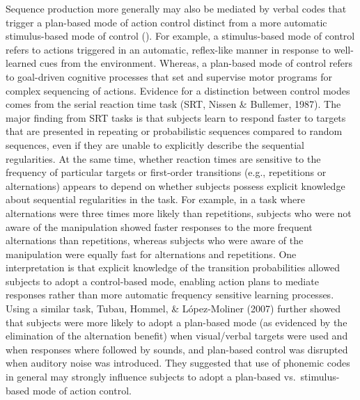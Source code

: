\documentclass[,man,floatsintext]{apa6}
\begin{document}
Sequence production more generally may also be mediated by verbal codes that trigger a plan-based mode of action control distinct from a more automatic stimulus-based mode of control (). For example, a stimulus-based mode of control refers to actions triggered in an automatic, reflex-like manner in response to well-learned cues from the environment. Whereas, a plan-based mode of control refers to goal-driven cognitive processes that set and supervise motor programs for complex sequencing of actions. Evidence for a distinction between control modes comes from the serial reaction time task (SRT, Nissen \& Bullemer, 1987). The major finding from SRT tasks is that subjects learn to respond faster to targets that are presented in repeating or probabilistic sequences compared to random sequences, even if they are unable to explicitly describe the sequential regularities. At the same time, whether reaction times are sensitive to the frequency of particular targets or first-order transitions (e.g., repetitions or alternations) appears to depend on whether subjects possess explicit knowledge about sequential regularities in the task. For example, in a task where alternations were three times more likely than repetitions, subjects who were not aware of the manipulation showed faster responses to the more frequent alternations than repetitions, whereas subjects who were aware of the manipulation were equally fast for alternations and repetitions. One interpretation is that explicit knowledge of the transition probabilities allowed subjects to adopt a control-based mode, enabling action plans to mediate responses rather than more automatic frequency sensitive learning processes. Using a similar task, Tubau, Hommel, \& López-Moliner (2007) further showed that subjects were more likely to adopt a plan-based mode (as evidenced by the elimination of the alternation benefit) when visual/verbal targets were used and when responses where followed by sounds, and plan-based control was disrupted when auditory noise was introduced. They suggested that use of phonemic codes in general may strongly influence subjects to adopt a plan-based vs.~stimulus-based mode of action control.
\end{document}
